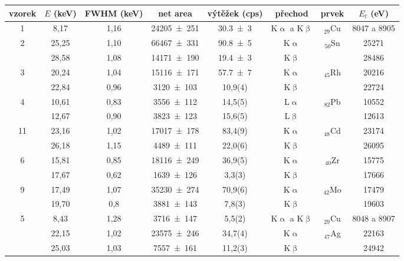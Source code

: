 \begin{tabulka}[htbp]
\centering
\begin{tabular}{c|ccccc|cc}
vzorek & $E$ (\si{\keV}) & FWHM (\si{\keV}) & net area & výtěžek (cps) & přechod & prvek & $E_t$ (\si{\eV})\\ \hline\hline

1 & 8,17 & 1,16 & \num{24205(251)} & \num{30,3(3)} & K$\upalpha$ a K$\upbeta$ & $_{29}$Cu & 8047 a 8905\\  \hline
\multirow{2}{*}{2} & 25,25 & 1,10 & \num{66467(331)} & \num{90,8(5)} & K$\upalpha$ & \multirow{2}{*}{$_{50}$Sn} & \num{25271}\\
 & 28,58 & 1,08 & \num{14171(190)} & \num{19,4(3)} & K$\upbeta$ &  & \num{28486}\\ \hline
\multirow{2}{*}{3} & 20,24 & 1,04 & \num{15116(171)} & \num{57,7(7)} & K$\upalpha$ & \multirow{2}{*}{$_{45}$Rh} & \num{20216}\\ 
 & 22,84 & 0,96 & \num{3120(103)} & 10,9(4) & K$\upbeta$ & & \num{22724}\\ \hline
\multirow{2}{*}{4} & 10,61 & 0,83 & \num{3556(112)} & 14,5(5) & L$\upalpha$ & \multirow{2}{*}{$_{82}$Pb} & \num{10552}\\ 
 & 12,67 & 0,90 & \num{3823(123)} & 15,6(5) & L$\upbeta$ & & \num{12613}\\ \hline
\multirow{2}{*}{11} & 23,16 & 1,02 & \num{17017(178)} & 83,4(9) & K$\upalpha$ & \multirow{2}{*}{$_{48}$Cd} & \num{23174}\\ 
 & 26,18 & 1,15 & \num{4489(111)} & 22,0(6) & K$\upbeta$ & & \num{26095}\\ \hline
\multirow{2}{*}{6} & 15,81 & 0,85 & \num{18116(249)} & 36,9(5) & K$\upalpha$ & \multirow{2}{*}{$_{40}$Zr} & \num{15775}\\
 & 17,67 & 0,62 & \num{1639(126)} & 3,3(3) & K$\upbeta$ &  & \num{17666}\\ \hline
\multirow{2}{*}{9} & 17,49 & 1,07 & \num{35230(274)} & 70,9(6) & K$\upalpha$ & \multirow{2}{*}{$_{42}$Mo} & \num{17479}\\ 
 & 19,70 & 0,8 & \num{3881(143)} & 7,8(3) & K$\upbeta$ &  & \num{19603}\\ \hline\hline
\multirow{3}{*}{5} & 8,43 & 1,28 & \num{3716(147)} & 5,5(2) & K$\upalpha$ a K$\upbeta$ & $_{29}$Cu & 8048 a 8907 \\
 & 22,15 & 1,02 & \num{23575(246)} & 34,7(4) & K$\upalpha$ & \multirow{2}{*}{$_{47}$Ag} & \num{22163}\\
 & 25,03 & 1,03 & \num{7557(161)} & 11,2(3) & K$\upbeta$ & & \num{24942}\\ \hline

\end{tabular}
\end{tabulka}
